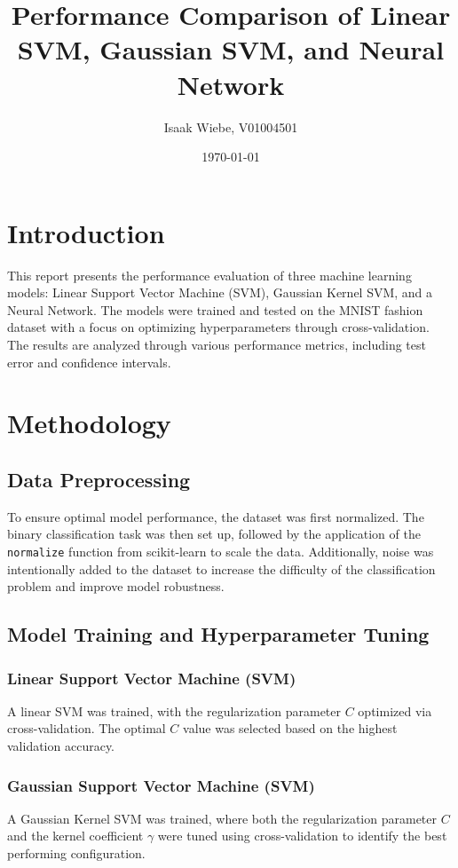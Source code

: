 \documentclass{article}
\title{Performance Comparison of Linear SVM, Gaussian SVM, and Neural Network}
\author{Isaak Wiebe, V01004501}
\date{\today}
\begin{document}
\maketitle

\section{Introduction}
This report presents the performance evaluation of three machine learning models: Linear Support Vector Machine (SVM), Gaussian Kernel SVM, and a Neural Network. The models were trained and tested on the MNIST fashion dataset with a focus on optimizing hyperparameters through cross-validation. The results are analyzed through various performance metrics, including test error and confidence intervals.

\section{Methodology}

\subsection{Data Preprocessing}
To ensure optimal model performance, the dataset was first normalized. The binary classification task was then set up, followed by the application of the \texttt{normalize} function from scikit-learn to scale the data. Additionally, noise was intentionally added to the dataset to increase the difficulty of the classification problem and improve model robustness.

\subsection{Model Training and Hyperparameter Tuning}

\subsubsection{Linear Support Vector Machine (SVM)}
A linear SVM was trained, with the regularization parameter $C$ optimized via cross-validation. The optimal $C$ value was selected based on the highest validation accuracy.

\subsubsection{Gaussian Support Vector Machine (SVM)}
A Gaussian Kernel SVM was trained, where both the regularization parameter $C$ and the kernel coefficient $\gamma$ were tuned using cross-validation to identify the best performing configuration.
\end{document}

